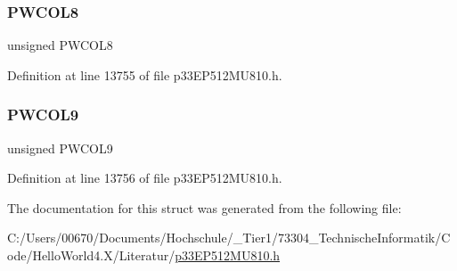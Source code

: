 \subsubsection{\texorpdfstring{P\+W\+C\+O\+L8}{PWCOL8}}
{\footnotesize\ttfamily unsigned P\+W\+C\+O\+L8}



Definition at line 13755 of file p33\+E\+P512\+M\+U810.\+h.

\mbox{\label{structtag_d_m_a_p_w_c_b_i_t_s_ace3b7aa4f1180e70accce990ca1a3458}} 
\subsubsection{\texorpdfstring{P\+W\+C\+O\+L9}{PWCOL9}}
{\footnotesize\ttfamily unsigned P\+W\+C\+O\+L9}



Definition at line 13756 of file p33\+E\+P512\+M\+U810.\+h.



The documentation for this struct was generated from the following file\+:\begin{DoxyCompactItemize}
\item 
C\+:/\+Users/00670/\+Documents/\+Hochschule/\+\_\+\+Tier1/73304\+\_\+\+Technische\+Informatik/\+Code/\+Hello\+World4.\+X/\+Literatur/\hyperlink{p33_e_p512_m_u810_8h}{p33\+E\+P512\+M\+U810.\+h}\end{DoxyCompactItemize}
